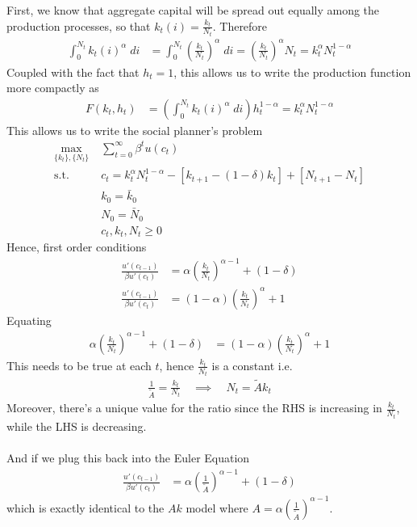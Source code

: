 \documentclass[12pt]{article}
\theoremstyle{plain}
\theoremstyle{definition}
\theoremstyle{remark}
\newcommand{\sumtinfz}{\sum^\infty_{t=0}}
\begin{document}
First, we know that aggregate capital will be spread out equally among
the production processes, so that $k_t(i) = \frac{k_t}{N_t}$. Therefore
\begin{align*}
  \int_0^{N_t} k_t(i)^\alpha \; di
  &=
  \int_0^{N_t} \left(\frac{k_t}{N_t}\right)^\alpha \; di
  =
  \left(\frac{k_t}{N_t}\right)^\alpha N_t
  = k_t^\alpha N_t^{1-\alpha}
\end{align*}
Coupled with the fact that $h_t=1$, this allows us to write the
production function more compactly as
\begin{align*}
  F(k_t,h_t)
  &= \left( \int_0^{N_t} k_t(i)^\alpha \; di\right)
    h_t^{1-\alpha}
  = k_t^{\alpha} N_t^{1-\alpha}
\end{align*}
This allows us to write the social planner's problem
\begin{align*}
  \max_{\{k_t\},\{N_t\}} \; & \sumtinfz \beta^t u(c_t) \\
  \text{s.t.} \; &
    c_t =
    k_t^\alpha N_t^{1-\alpha}
    - [k_{t+1}-(1-\delta)k_t] + [N_{t+1}-N_t] \\
    & k_0 = \bar{k}_0 \\
    & N_0 = \bar{N}_0 \\
    & c_t, k_t,N_t\geq 0
\end{align*}
Hence, first order conditions
\begin{align*}
  \frac{u'(c_{t-1})}{\beta u'(c_t)}
  &=
  \alpha \left(\frac{k_t}{N_t}\right)^{\alpha-1} + (1-\delta) \\
  \frac{u'(c_{t-1})}{\beta u'(c_t)}
  &=
  (1-\alpha) \left(  \frac{k_t}{N_t} \right)^{\alpha} + 1
\end{align*}
Equating
\begin{align*}
  \alpha \left(\frac{k_t}{N_t}\right)^{\alpha-1} + (1-\delta)
  &=
  (1-\alpha) \left(  \frac{k_t}{N_t} \right)^{\alpha} + 1
\end{align*}
This needs to be true at each $t$, hence $\frac{k_t}{N_t}$ is a
constant i.e.
\begin{align*}
  \frac{1}{\tilde{A}} = \frac{k_t}{N_t}
  \quad\implies\quad
  N_t = \tilde{A}k_t
\end{align*}
Moreover, there's a unique value for the ratio since the RHS is
increasing in $\frac{k_t}{N_t}$, while the LHS is decreasing.
\\
\\
And if we plug this back into the Euler Equation
\begin{align*}
  \frac{u'(c_{t-1})}{\beta u'(c_t)}
  &=
  \alpha \left(\frac{1}{\tilde{A}}\right)^{\alpha-1} + (1-\delta)
\end{align*}
which is exactly identical to the $Ak$ model where
$A=\alpha \left(\frac{1}{\tilde{A}}\right)^{\alpha-1}$.
\end{document}

